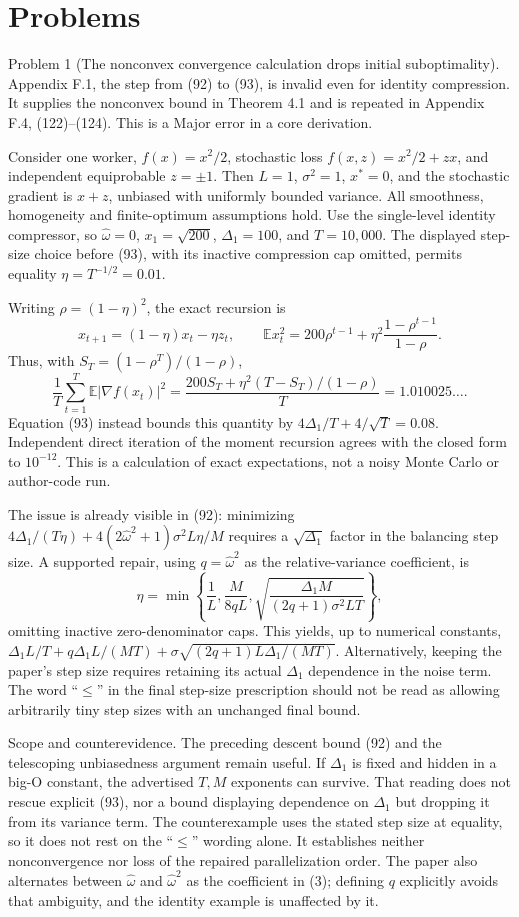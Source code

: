 \documentclass[10pt]{article}
\begin{document}
\section*{Problems}
Problem 1 (The nonconvex convergence calculation drops initial suboptimality).  Appendix F.1, the step from (92) to (93), is invalid even for identity compression. It supplies the nonconvex bound in Theorem 4.1 and is repeated in Appendix F.4, (122)–(124). This is a Major error in a core derivation.\par
Consider one worker, \(f(x)=x^2/2\), stochastic loss \(f(x,z)=x^2/2+zx\), and independent equiprobable \(z=\pm1\). Then \(L=1\), \(\sigma^2=1\), \(x^*=0\), and the stochastic gradient is \(x+z\), unbiased with uniformly bounded variance. All smoothness, homogeneity and finite-optimum assumptions hold. Use the single-level identity compressor, so \(\widehat\omega=0\), \(x_1=\sqrt{200}\), \(\Delta_1=100\), and \(T=10{,}000\). The displayed step-size choice before (93), with its inactive compression cap omitted, permits equality \(\eta=T^{-1/2}=0.01\).\par
Writing \(\rho=(1-\eta)^2\), the exact recursion is \[x_{t+1}=(1-\eta)x_t-\eta z_t,\qquad
 \mathbb E x_t^2=200\rho^{t-1}+\eta^2\frac{1-\rho^{t-1}}{1-\rho}.\] Thus, with \(S_T=(1-\rho^T)/(1-\rho)\), \[\frac1T\sum_{t=1}^T\mathbb E|\nabla f(x_t)|^2
 =\frac{200S_T+\eta^2(T-S_T)/(1-\rho)}{T}
 =1.010025\ldots.\] Equation (93) instead bounds this quantity by \(4\Delta_1/T+4/\sqrt T=0.08\). Independent direct iteration of the moment recursion agrees with the closed form to \(10^{-12}\). This is a calculation of exact expectations, not a noisy Monte Carlo or author-code run.\par
The issue is already visible in (92): minimizing \(4\Delta_1/(T\eta)+4(2\widehat\omega^2+1)\sigma^2 L\eta/M\) requires a \(\sqrt{\Delta_1}\) factor in the balancing step size. A supported repair, using \(q=\widehat\omega^2\) as the relative-variance coefficient, is \[\eta=\min\left\{\frac1L,\frac{M}{8qL},
 \sqrt{\frac{\Delta_1 M}{(2q+1)\sigma^2 LT}}\right\},\] omitting inactive zero-denominator caps. This yields, up to numerical constants, \(\Delta_1 L/T+q\Delta_1 L/(MT)+
\sigma\sqrt{(2q+1)L\Delta_1/(MT)}\). Alternatively, keeping the paper’s step size requires retaining its actual \(\Delta_1\) dependence in the noise term. The word “\(\leq\)” in the final step-size prescription should not be read as allowing arbitrarily tiny step sizes with an unchanged final bound.\par
Scope and counterevidence. The preceding descent bound (92) and the telescoping unbiasedness argument remain useful. If \(\Delta_1\) is fixed and hidden in a big-O constant, the advertised \(T,M\) exponents can survive. That reading does not rescue explicit (93), nor a bound displaying dependence on \(\Delta_1\) but dropping it from its variance term. The counterexample uses the stated step size at equality, so it does not rest on the “\(\leq\)” wording alone. It establishes neither nonconvergence nor loss of the repaired parallelization order. The paper also alternates between \(\widehat\omega\) and \(\widehat\omega^2\) as the coefficient in (3); defining \(q\) explicitly avoids that ambiguity, and the identity example is unaffected by it.\par
\end{document}
